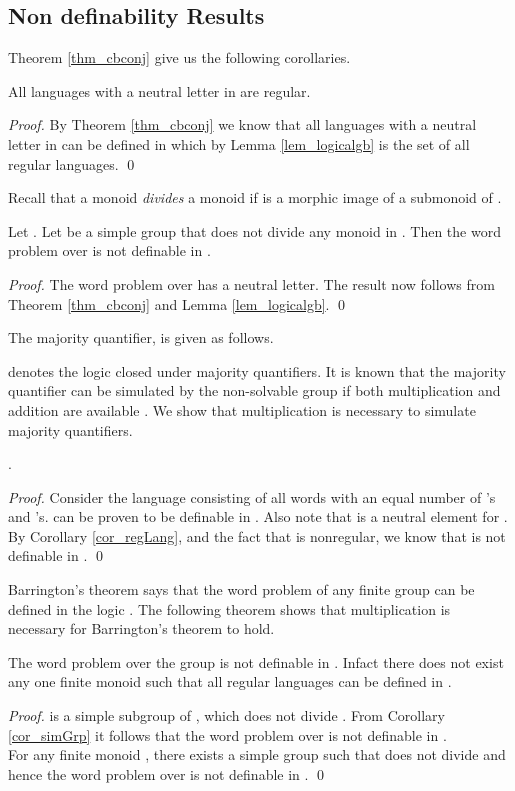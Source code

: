\documentclass[envcountsame]{llncs}
\begin{document}
\subsection{Non definability Results}

Theorem \ref{thm_cbconj} give us the following corollaries. 
\begin{corollary} 
\label{cor_regLang}
All languages with a neutral letter in  are regular.
\end{corollary}
\begin{proof}
 By Theorem \ref{thm_cbconj} we know that all languages with a neutral letter in  can be defined in  which by Lemma \ref{lem_logicalgb} is the set of all regular languages.
\qed \end{proof}

Recall that a monoid  \emph{divides} a monoid  if  is a morphic image of a submonoid of .

\begin{corollary}
  \label{cor_simGrp}
Let . Let  be a simple group that does not divide any monoid  in . Then the word problem over  is not definable in .
\end{corollary}
\begin{proof}
The word problem over  has a neutral letter. The result now follows from Theorem \ref{thm_cbconj} and Lemma \ref{lem_logicalgb}.
\qed \end{proof}



The majority quantifier,  is given as follows.

  denotes the logic closed under majority quantifiers.
It is known that the majority quantifier can be simulated by the non-solvable group  if both multiplication and addition are available \cite{vollmer_book}. We show that multiplication is necessary to simulate majority quantifiers.
\begin{corollary}
.
\end{corollary}
\begin{proof}
 Consider the language  consisting of all words with an equal number of 's and 's.  can be proven to be definable in . Also note that  is a neutral element for . By Corollary \ref{cor_regLang}, and the fact that  is nonregular,  we know that  is not definable in .
\qed \end{proof}

Barrington's theorem \cite{barr_NC1} says that the word problem of any finite group can be defined in the logic . The following theorem shows that multiplication is necessary for Barrington's theorem to hold.
\begin{corollary}
  The word problem over the group  is not definable in . Infact there does not exist any one finite monoid 
  such that all regular languages can be defined in .
\end{corollary}
\begin{proof}
   is a simple subgroup of , which does not divide . From Corollary \ref{cor_simGrp} it follows that the word problem over
   is not definable in . \\
  For any finite monoid , there exists a simple group  such that  does not divide  and hence the word problem over  is
  not definable in .
\qed \end{proof}
\end{document}
